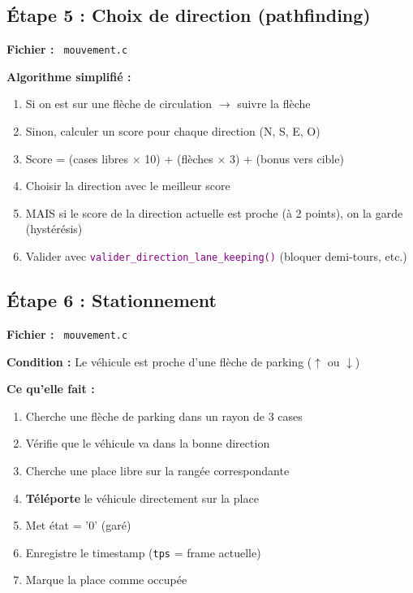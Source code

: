 \documentclass[11pt,a4paper]{article}
\newcommand{\fichier}[1]{\texttt{\textcolor{primary}{\faIcon{file-code} #1}}}
\newcommand{\fonction}[1]{\texttt{\textcolor{purple}{#1()}}}
\newcommand{\variable}[1]{\texttt{\textcolor{success}{#1}}}
\begin{document}
\subsection{Étape 5 : Choix de direction (pathfinding)}

\begin{funcbox}
\textbf{Fichier :} \fichier{mouvement.c}

\textbf{Algorithme simplifié :}
\begin{enumerate}[noitemsep]
    \item Si on est sur une flèche de circulation $\rightarrow$ suivre la flèche
    \item Sinon, calculer un score pour chaque direction (N, S, E, O)
    \item Score = (cases libres × 10) + (flèches × 3) + (bonus vers cible)
    \item Choisir la direction avec le meilleur score
    \item MAIS si le score de la direction actuelle est proche (à 2 points), on la garde (hystérésis)
    \item Valider avec \fonction{valider\_direction\_lane\_keeping} (bloquer demi-tours, etc.)
\end{enumerate}
\end{funcbox}

\subsection{Étape 6 : Stationnement}

\begin{funcbox}
\textbf{Fichier :} \fichier{mouvement.c}

\textbf{Condition :} Le véhicule est proche d'une flèche de parking ($\uparrow$ ou $\downarrow$)

\textbf{Ce qu'elle fait :}
\begin{enumerate}[noitemsep]
    \item Cherche une flèche de parking dans un rayon de 3 cases
    \item Vérifie que le véhicule va dans la bonne direction
    \item Cherche une place libre sur la rangée correspondante
    \item \textbf{Téléporte} le véhicule directement sur la place
    \item Met état = '0' (garé)
    \item Enregistre le timestamp (\variable{tps} = frame actuelle)
    \item Marque la place comme occupée
\end{enumerate}
\end{funcbox}
\end{document}

